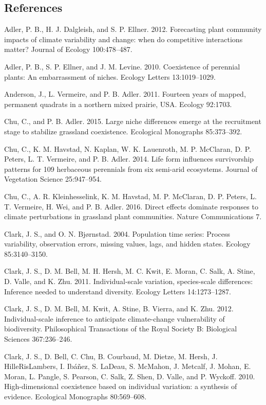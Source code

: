 \documentclass[12pt,]{article}
\begin{document}
\newpage{}

\singlespace{}

\subsection*{References}\label{references}

Adler, P. B., H. J. Dalgleish, and S. P. Ellner. 2012. Forecasting plant
community impacts of climate variability and change: when do competitive
interactions matter? Journal of Ecology 100:478--487.

Adler, P. B., S. P. Ellner, and J. M. Levine. 2010. Coexistence of
perennial plants: An embarrassment of niches. Ecology Letters
13:1019--1029.

Anderson, J., L. Vermeire, and P. B. Adler. 2011. Fourteen years of
mapped, permanent quadrats in a northern mixed prairie, USA. Ecology
92:1703.

Chu, C., and P. B. Adler. 2015. Large niche differences emerge at the
recruitment stage to stabilize grassland coexistence. Ecological
Monographs 85:373--392.

Chu, C., K. M. Havstad, N. Kaplan, W. K. Lauenroth, M. P. McClaran, D.
P. Peters, L. T. Vermeire, and P. B. Adler. 2014. Life form influences
survivorship patterns for 109 herbaceous perennials from six semi-arid
ecosystems. Journal of Vegetation Science 25:947--954.

Chu, C., A. R. Kleinhesselink, K. M. Havstad, M. P. McClaran, D. P.
Peters, L. T. Vermeire, H. Wei, and P. B. Adler. 2016. Direct effects
dominate responses to climate perturbations in grassland plant
communities. Nature Communications 7.

Clark, J. S., and O. N. Bj{ø}rnstad. 2004. Population time series:
Process variability, observation errors, missing values, lags, and
hidden states. Ecology 85:3140--3150.

Clark, J. S., D. M. Bell, M. H. Hersh, M. C. Kwit, E. Moran, C. Salk, A.
Stine, D. Valle, and K. Zhu. 2011. Individual-scale variation,
species-scale differences: Inference needed to understand diversity.
Ecology Letters 14:1273--1287.

Clark, J. S., D. M. Bell, M. Kwit, A. Stine, B. Vierra, and K. Zhu.
2012. Individual-scale inference to anticipate climate-change
vulnerability of biodiversity. Philosophical Transactions of the Royal
Society B: Biological Sciences 367:236--246.

Clark, J. S., D. Bell, C. Chu, B. Courbaud, M. Dietze, M. Hersh, J.
HilleRisLambers, I. Ib{á}{ñ}ez, S. LaDeau, S. McMahon, J. Metcalf, J.
Mohan, E. Moran, L. Pangle, S. Pearson, C. Salk, Z. Shen, D. Valle, and
P. Wyckoff. 2010. High-dimensional coexistence based on individual
variation: a synthesis of evidence. Ecological Monographs 80:569--608.
\end{document}

